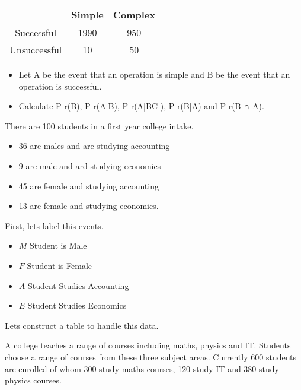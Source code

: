 	\begin{center}
	
	\begin{tabular}{ccc}
			 & Simple & Complex \\ \hline
			 Successful & 1990 & 950 \\ \hline
			 Unsuccessful & 10 & 50\\ \hline
	\end{tabular} 	
	\end{center}	

			
			\begin{itemize}
				\item Let A be the event that an operation is simple and B be the event that an
				operation is successful. 
				\item Calculate P r(B), P r(A|B), P r(A|BC ), P r(B|A) and
				P r(B ∩ A). 
			\end{itemize}



There are 100 students in a first year college intake. 
\begin{itemize}
\item 36 are males and are studying accounting
\item 9 are male and ard studying economics
\item 45 are female and studying accounting
\item 13 are female and studying economics.

\end{itemize}

First, lets label this events.

\begin{itemize}
\item $M$ Student is Male
\item $F$ Student is Female
\item $A$ Student Studies Accounting
\item $E$ Student Studies Economics
\end{itemize}

Lets construct a table to handle this data.




A college teaches a range of courses including maths, physics and IT.
Students choose a range of courses from these three subject areas. Currently 600
students are enrolled of whom 300 study maths courses, 120 study IT
and 380 study physics courses. 

